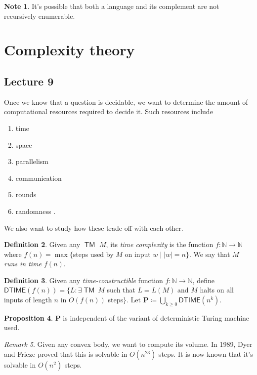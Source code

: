 \documentclass[10pt,letterpaper,cm]{nupset}
\theoremstyle{definition}
\newtheorem{definition}{Definition}[subsection]
\newtheorem{note}[definition]{Note}
\theoremstyle{theorem}
\newtheorem{prop}[definition]{Proposition}
\theoremstyle{remark}
\newtheorem{remark}[definition]{Remark}
\newcommand{\N}{\mathbb N}
\newcommand{\1}{\mathbf{1}}
\newcommand{\0}{\vec 0}
\DeclareMathOperator{\TM}{\mathsf{TM}}
\begin{document}
\begin{note}
It's possible that both a language and its complement are not recursively enumerable. 
\end{note}

\section{Complexity theory}

\subsection{Lecture 9}


Once we know that a question is decidable, we want to determine the amount of computational resources required to decide it. Such resources include 
\begin{enumerate}[label=(\alph*)]
\item time
\item space
\item parallelism 
\item communication 
\item rounds
\item randomness
.\end{enumerate}
We also want to study how these trade off with each other. 

\smallskip

\begin{definition}
Given any $\TM$ $M$, its \textit{time complexity} is the function $f: \N \to \N$ where $f(n) =\max\{$steps used by $M$ on input $w\mid \lvert{w}\rvert =n\}$. We say that $M$ \textit{runs in time $f(n)$}.
\end{definition}

\begin{definition}
 Given any \textit{time-constructible} function $f: \N \to \N$, define $\mathsf{DTIME}(f(n)) = \{ L : \exists \TM \ M$ such that $L = L(M)$ and $M$ halts on all inputs of length $n$ in $O(f(n))$ steps$\}$.
Let $\mathbf{P} \coloneqq \bigcup_{k\geq 0} \mathsf{DTIME}(n^k)$.
\end{definition}

\begin{prop}
$\mathbf{P}$ is independent of the variant of deterministic Turing machine used. 
\end{prop}

\begin{remark}
Given any convex body, we want to compute its volume. In 1989, Dyer and Frieze proved that this is solvable in $O(n^{23})$ steps. It is now known that it's solvable in $O(n^2)$ steps. 
\end{remark}
\end{document}
